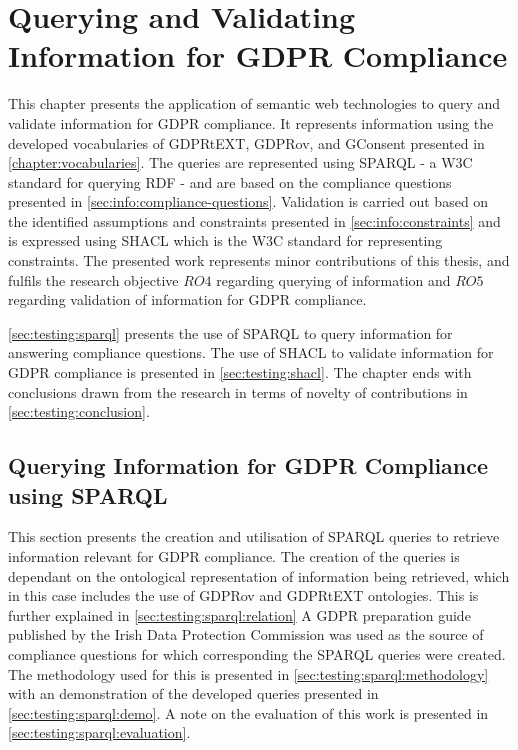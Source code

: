 \chapter{Querying and Validating Information for GDPR Compliance}
\label{chapter:testing}
This chapter presents the application of semantic web technologies to query and validate information for GDPR compliance.
It represents information using the developed vocabularies of GDPRtEXT, GDPRov, and GConsent presented in \autoref{chapter:vocabularies}.
The queries are represented using SPARQL - a W3C standard for querying RDF - and are based on the compliance questions presented in \autoref{sec:info:compliance-questions}.
Validation is carried out based on the identified assumptions and constraints presented in \autoref{sec:info:constraints} and is expressed using SHACL which is the W3C standard for representing constraints.
The presented work represents minor contributions of this thesis, and fulfils the research objective $RO4$ regarding querying of information and $RO5$ regarding validation of information for GDPR compliance.

\autoref{sec:testing:sparql} presents the use of SPARQL to query information for answering compliance questions.
The use of SHACL to validate information for GDPR compliance is presented in \autoref{sec:testing:shacl}.
The chapter ends with conclusions drawn from the research in terms of novelty of contributions in \autoref{sec:testing:conclusion}.

\section{Querying Information for GDPR Compliance using SPARQL}\label{sec:testing:sparql}
This section presents the creation and utilisation of SPARQL queries to retrieve information relevant for GDPR compliance.
The creation of the queries is dependant on the ontological representation of information being retrieved, which in this case includes the use of GDPRov and GDPRtEXT ontologies. This is further explained in \autoref{sec:testing:sparql:relation}
A GDPR preparation guide published by the Irish Data Protection Commission was used as the source of compliance questions for which corresponding the SPARQL queries were created. The methodology used for this is presented in \autoref{sec:testing:sparql:methodology} with an demonstration of the developed queries presented in \autoref{sec:testing:sparql:demo}.
A note on the evaluation of this work is presented in \autoref{sec:testing:sparql:evaluation}.

